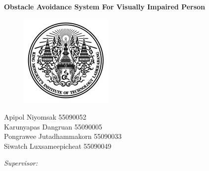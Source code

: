 \documentclass[11pt, oneside]{Thesis} %
\begin{document}
\begin{titlepage}
\begin{center}


{\huge \bfseries Obstacle Avoidance System For Visually Impaired Person}\\[0.4cm] %

\vspace{2 cm}
\begin{figure}[h]
	\centering
	\includegraphics[scale=1.2]{kmitl.JPG}
\end{figure}

\vspace{2 cm}
\begin{minipage}{0.7\textwidth} 
\begin{center} \large

\begin{center}{}
	Apipol Niyomsak 55090052 \\
	Karunyapas Dangruan 55090005 \\
	Pongrawee Jutadhammakorn 55090033 \\
	Siwatch Luxsameepicheat 55090049 \\

\end{center}

\end{center}
\end{minipage}

\vspace{0.5 cm}
\begin{minipage}{0.4\textwidth}
\begin{center} \large
\emph{Supervisor:} \\
{\supname} %
\end{center}
\end{minipage}\\[2cm]



\end{center}
\end{titlepage}
\end{document}
